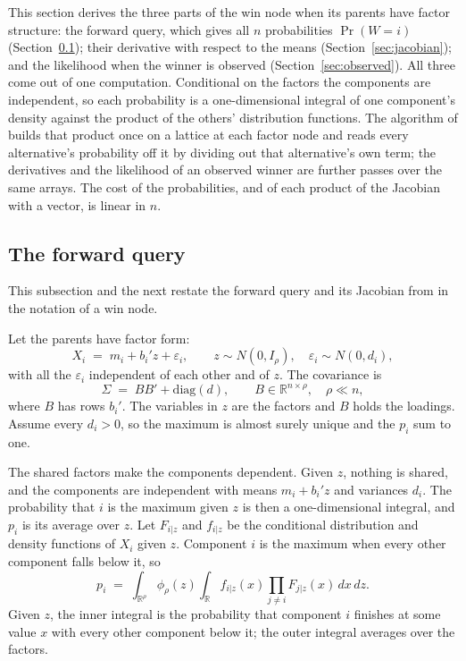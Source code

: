 \documentclass[11pt]{article}
\begin{document}
This section derives the three parts of the win node when its
parents have factor structure: the forward query, which gives all $n$
probabilities $\Pr(W=i)$ (Section~\ref{sec:forward}); their
derivative with respect to the means (Section~\ref{sec:jacobian});
and the likelihood when the winner is observed
(Section~\ref{sec:observed}). All three come out of one computation.
Conditional on the factors the components are independent, so each
probability is a one-dimensional integral of one component's density
against the product of the others' distribution functions. The
algorithm of \citet{cotton2026} builds that product once on a lattice
at each factor node and reads every alternative's probability off it
by dividing out that alternative's own term; the derivatives and the
likelihood of an observed winner are further passes over the same
arrays. The cost of the probabilities, and of each product of the
Jacobian with a vector, is linear in $n$.

\subsection{The forward query}
\label{sec:forward}

This subsection and the next restate the forward query and its
Jacobian from \citet{cotton2026} in the notation of a win node.

Let the parents have factor form:
\begin{equation}
X_i \;=\; m_i + b_i' z + \varepsilon_i, \qquad
z \sim N(0, I_\rho), \quad \varepsilon_i \sim N(0, d_i),
\label{eq:factormodel}
\end{equation}
with all the $\varepsilon_i$ independent of each other and of $z$.
The covariance is
\begin{equation}
\Sigma \;=\; B B' + \mathrm{diag}(d), \qquad B \in
\mathbb{R}^{n \times \rho}, \quad \rho \ll n,
\label{eq:factor}
\end{equation}
where $B$ has rows $b_i'$. The variables in $z$ are the factors and
$B$ holds the loadings. Assume every $d_i > 0$, so the maximum is
almost surely unique and the $p_i$ sum to one.

The shared factors make the components dependent. Given $z$, nothing
is shared, and the components are independent with means
$m_i + b_i' z$ and variances $d_i$. The probability that $i$ is the
maximum given $z$ is then a one-dimensional integral, and $p_i$ is
its average over $z$. Let $F_{i|z}$ and $f_{i|z}$ be the conditional
distribution and density functions of $X_i$ given $z$. Component $i$
is the maximum when every other component falls below it, so
\begin{equation}
p_i \;=\; \int_{\mathbb{R}^\rho} \phi_\rho(z) \int_{\mathbb{R}}
f_{i|z}(x) \prod_{j \neq i} F_{j|z}(x)\, dx \, dz .
\label{eq:integral}
\end{equation}
Given $z$, the inner integral is the probability that component $i$
finishes at some value $x$ with every other component below it; the
outer integral averages over the factors.
\end{document}

